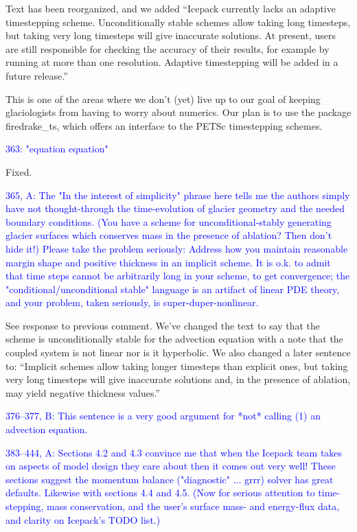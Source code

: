 \documentclass{article}
\theoremstyle{definition}
\theoremstyle{plain}
\begin{document}
Text has been reorganized, and we added ``Icepack currently lacks an adaptive timestepping scheme.
Unconditionally stable schemes allow taking long timesteps, but taking very long timesteps will give inaccurate solutions.
At present, users are still responsible for checking the accuracy of their results, for example by running at more than one resolution.
Adaptive timestepping will be added in a future release.''

This is one of the areas where we don't (yet) live up to our goal of keeping glaciologists from having to worry about numerics.
Our plan is to use the package firedrake\_ts, which offers an interface to the PETSc timestepping schemes.

\textcolor{blue}{363:  "equation equation"}

Fixed.

\textcolor{blue}{365, A:  The "In the interest of simplicity" phrase here tells me the authors simply have not thought-through the time-evolution of glacier geometry and the needed boundary conditions.  (You have a scheme for unconditional-stably generating glacier surfaces which conserves mass in the presence of ablation?  Then don't hide it!)  Please take the problem seriously:  Address how you maintain reasonable margin shape and positive thickness in an implicit scheme.  It is o.k. to admit that time steps cannot be arbitrarily long in your scheme, to get convergence; the "conditional/unconditional stable" language is an artifact of linear PDE theory, and your problem, taken seriously, is super-duper-nonlinear.}

See response to previous comment.
We've changed the text to say that the scheme is unconditionally stable for the advection equation with a note that the coupled system is not linear nor is it hyperbolic.
We also changed a later sentence to: ``Implicit schemes allow taking longer timesteps than explicit ones, but taking very long timesteps will give inaccurate solutions and, in the presence of ablation, may yield negative thickness values.''

\textcolor{blue}{376--377, B:  This sentence is a very good argument for *not* calling (1) an advection equation.}

\textcolor{blue}{383--444, A:  Sections 4.2 and 4.3 convince me that when the Icepack team takes on aspects of model design they care about then it comes out very well!  These sections suggest the momentum balance ("diagnostic" ... grrr) solver has great defaults.  Likewise with sections 4.4 and 4.5.  (Now for serious attention to time-stepping, mass conservation, and the user's surface mass- and energy-flux data, and clarity on Icepack's TODO list.)}
\end{document}
